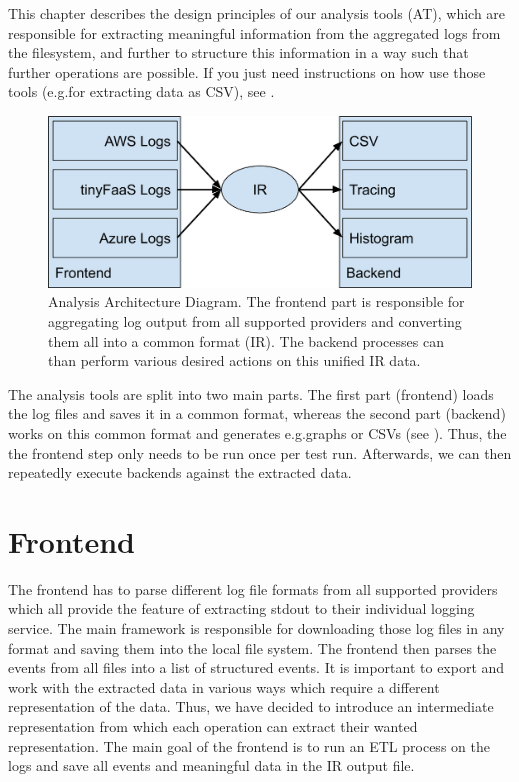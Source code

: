 \documentclass[../main.tex]{subfiles}
\begin{document}
This chapter describes the design principles of our analysis tools (AT), 
which are responsible for extracting meaningful information from the aggregated logs from the filesystem, 
and further to structure this information in a way such that further operations are possible. 
If you just need instructions on how use those tools (e.g.\@ for extracting data as CSV), 
see .

\begin{figure}
\begin{center}
  \includegraphics[width=\linewidth,keepaspectratio]{./IR-diagram.png}
\end{center}
\caption[Analysis Architecture Diagram]{%
Analysis Architecture Diagram. 
The frontend part is responsible for aggregating log output from all supported providers
and converting them all into a common format (IR). 
The backend processes can than perform various desired actions on this unified IR data.}%
\label{fig:analysisArchitectureDiagram}
\end{figure}

The analysis tools are split into two main parts. 
The first part (frontend) loads the log files and saves it in a common format, 
whereas the second part (backend) works on this common format and generates e.g.\@ graphs or CSVs
(see ).
Thus, the the frontend step only needs to be run once per test run.
Afterwards, we can then repeatedly execute backends against the extracted data.

\section{Frontend}%
\label{sec:analysisFrontend}

The frontend has to parse different log file formats from all supported providers 
which all provide the feature of extracting stdout to their individual logging service. 
The main framework is responsible for downloading those log files in any format and saving them into the local file system. 
The frontend then parses the events from all files into a list of structured events. 
It is important to export and work with the extracted data in various ways which require a different representation of the data. 
Thus, we have decided to introduce an intermediate representation from which each operation can extract their wanted representation. 
The main goal of the frontend is to run an ETL process on the logs and save all events and meaningful data in the IR output file.
\end{document}
